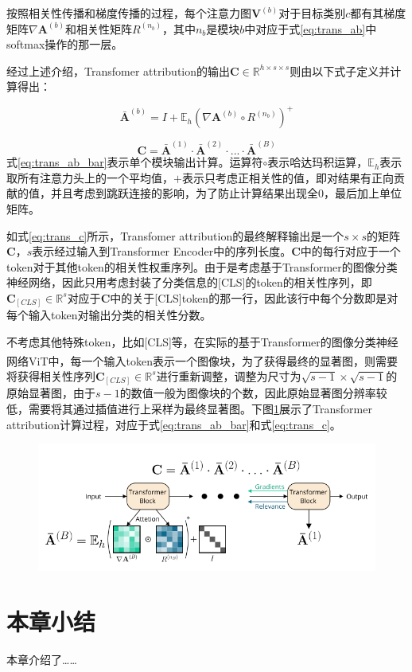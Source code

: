 按照相关性传播和梯度传播的过程，每个注意力图$\mathbf{V}^{(b)}$对于目标类别$c$都有其梯度矩阵$\nabla \mathbf{A}^{(b)}$和相关性矩阵$R^{(n_b)}$，其中$n_b$是模块$b$中对应于式\ref{eq:trans_ab}中softmax操作的那一层。

经过上述介绍，Transfomer attribution的输出$\mathbf{C} \in \mathbb{R}^{h\times s \times s}$则由以下式子定义并计算得出：

\begin{equation}
	\bar{\mathbf{A}}^{(b)} = I + \mathbb{E}_h(\nabla \mathbf{A}^{(b)} \circ R^{(n_b)})^+
	\label{eq:trans_ab_bar}
\end{equation}

\begin{equation}
	 \mathbf{C} = \bar{\mathbf{A}}^{(1)} \cdot \bar{\mathbf{A}}^{(2)} \cdot ... \cdot \bar{\mathbf{A}}^{(B)}
	\label{eq:trans_c}
\end{equation}
式\ref{eq:trans_ab_bar}表示单个模块输出计算。运算符$\circ$表示哈达玛积运算，$\mathbb{E}_h$表示取所有注意力头上的一个平均值，$+$表示只考虑正相关性的值，即对结果有正向贡献的值，并且考虑到跳跃连接的影响，为了防止计算结果出现全0，最后加上单位矩阵。

如式\ref{eq:trans_c}所示，Transfomer attribution的最终解释输出是一个$s\times s$的矩阵$\mathbf{C}$，$s$表示经过输入到Transformer Encoder中的序列长度。$\mathbf{C}$中的每行对应于一个token对于其他token的相关性权重序列。由于是考虑基于Transformer的图像分类神经网络，因此只用考虑封装了分类信息的[CLS]的token的相关性序列，即$\mathbf{C}_{[CLS]} \in \mathbb{R}^s$对应于$\mathbf{C}$中的关于[CLS]token的那一行，因此该行中每个分数即是对每个输入token对输出分类的相关性分数。

不考虑其他特殊token，比如[CLS]等，在实际的基于Transformer的图像分类神经网络ViT\textsuperscript{\cite{dosovitskiy2020image}}中，每一个输入token表示一个图像块，为了获得最终的显著图，则需要将获得相关性序列$\mathbf{C}_{[CLS]} \in \mathbb{R}^s$进行重新调整，调整为尺寸为$\sqrt{s-1}\times \sqrt{s-1}$的原始显著图，由于$s-1$的数值一般为图像块的个数，因此原始显著图分辨率较低，需要将其通过插值进行上采样为最终显著图。下图\ref{fig:trans1}展示了Transformer attribution计算过程，对应于式\ref{eq:trans_ab_bar}和式\ref{eq:trans_c}。
\begin{figure}[h]
	\centering 
	\includegraphics[width=12cm]{fig/ch2/trans1.png}
	\label{fig:trans1}
\end{figure}

\section{本章小结}
本章介绍了……




